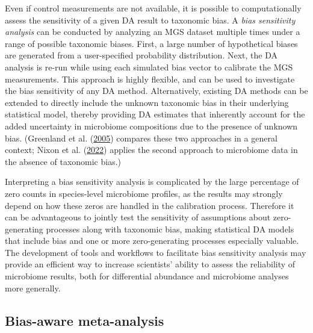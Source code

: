\documentclass[
]{article}
\begin{document}
Even if control measurements are not available, it is possible to computationally assess the sensitivity of a given DA result to taxonomic bias.
A \emph{bias sensitivity analysis} can be conducted by analyzing an MGS dataset multiple times under a range of possible taxonomic biases.
First, a large number of hypothetical biases are generated from a user-specified probability distribution.
Next, the DA analysis is re-run while using each simulated bias vector to calibrate the MGS measurements.
This approach is highly flexible, and can be used to investigate the bias sensitivity of any DA method.
Alternatively, existing DA methods can be extended to directly include the unknown taxonomic bias in their underlying statistical model, thereby providing DA estimates that inherently account for the added uncertainty in microbiome compositions due to the presence of unknown bias.
(Greenland et al. (\protect\hyperlink{ref-greenland2005mult}{2005}) compares these two approaches in a general context; Nixon et al. (\protect\hyperlink{ref-nixon2022asta}{2022}) applies the second approach to microbiome data in the absence of taxonomic bias.)

Interpreting a bias sensitivity analysis is complicated by the large percentage of zero counts in species-level microbiome profiles, as the results may strongly depend on how these zeros are handled in the calibration process.
Therefore it can be advantageous to jointly test the sensitivity of assumptions about zero-generating processes along with taxonomic bias, making statistical DA models that include bias and one or more zero-generating processes especially valuable.
The development of tools and workflows to facilitate bias sensitivity analysis may provide an efficient way to increase scientists' ability to assess the reliability of microbiome results, both for differential abundance and microbiome analyses more generally.

\hypertarget{bias-aware-meta-analysis}{%
\subsection{Bias-aware meta-analysis}\label{bias-aware-meta-analysis}}
\end{document}
